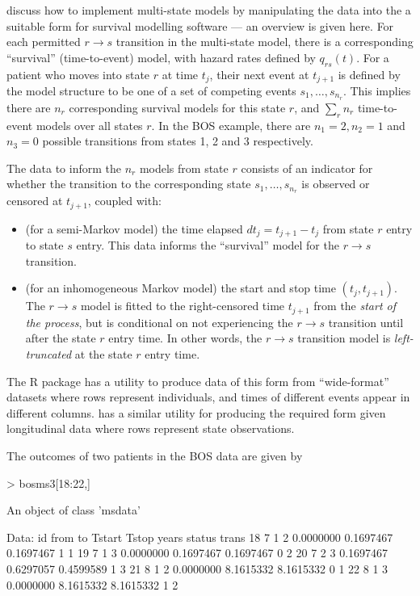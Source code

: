 \documentclass[nojss,nofooter]{jss}
\begin{document}
\citet{putter:mstate} discuss how to implement multi-state models by
manipulating the data into the a suitable form for survival modelling
software --- an overview is given here.  For each permitted $r
\rightarrow s$ transition in the multi-state model, there is a
corresponding ``survival'' (time-to-event) model, with hazard rates
defined by $q_{rs}(t)$.  For a patient who moves into state $r$ at
time $t_{j}$, their next event at $t_{j+1}$ is defined by the model
structure to be one of a set of competing events $s_1,\ldots,s_{n_r}$.
This implies there are $n_r$ corresponding survival models for this
state $r$, and $\sum_r n_r$ time-to-event models over all states $r$.
In the BOS example, there are $n_1=2,n_2=1$ and $n_3=0$ possible
transitions from states 1, 2 and 3 respectively.

The data to inform the $n_r$ models from state $r$ consists of an
indicator for whether the transition to the corresponding state
$s_1,\ldots,s_{n_r}$ is observed or censored at $t_{j+1}$, coupled
with:
\begin{itemize}
\item (for a semi-Markov model) the time elapsed $dt_{j} = t_{j+1} -
  t_{j}$ from state $r$ entry to state $s$ entry.  This data informs
  the ``survival'' model for the $r \rightarrow s$ transition.
  
\item (for an inhomogeneous Markov model) the start and stop time
  $(t_j,t_{j+1})$.  The $r \rightarrow s$ model is fitted to the
  right-censored time $t_{j+1}$ from the \emph{start of the process},
  but is conditional on not experiencing the $r \rightarrow s$
  transition until after the state $r$ entry time.  In other words,
  the $r \rightarrow s$ transition model is \emph{left-truncated} at
  the state $r$ entry time.
\end{itemize}

The  R package \citep{mstate:cmpb,mstate:jss} has a
utility  to produce data of this form from
``wide-format'' datasets where rows represent individuals, and times
of different events appear in different columns. 
\citep{msmjss} has a similar utility  for producing the
required form given longitudinal data where rows represent state
observations.

The outcomes of two patients in the BOS data are given by
\begin{Schunk}
\begin{Sinput}
> bosms3[18:22,]
\end{Sinput}
\begin{Soutput}
An object of class 'msdata'

Data:
   id from to    Tstart     Tstop     years status trans
18  7    1  2 0.0000000 0.1697467 0.1697467      1     1
19  7    1  3 0.0000000 0.1697467 0.1697467      0     2
20  7    2  3 0.1697467 0.6297057 0.4599589      1     3
21  8    1  2 0.0000000 8.1615332 8.1615332      0     1
22  8    1  3 0.0000000 8.1615332 8.1615332      1     2
\end{Soutput}
\end{Schunk}
\end{document}
